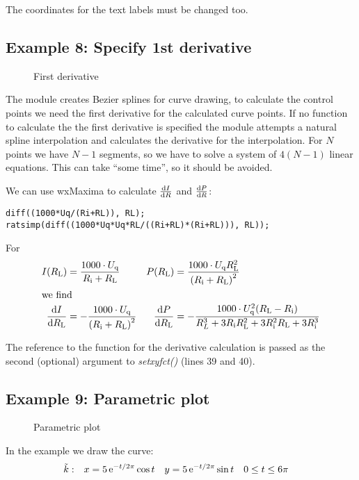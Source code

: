 \documentclass[origlongtable]{scrartcl}
\newcommand{\includepgfimage}[2]{%
\begin{figure}%
{\centering%
\caption{#2}\label{fig:#1}%
}%
\end{figure}%
}
\begin{document}
The coordinates for the text labels must be changed too.

\clearpage
\subsection[Derivative]{Example 8: Specify 1st derivative}
\includepgfimage{../examples/test008a}{First derivative}
The module creates Bezier splines for curve drawing, to calculate
the control points we need the first derivative for the calculated
curve points.
If no function to calculate the the first derivative is specified
the module attempts a natural spline interpolation and calculates
the derivative for the interpolation. For \(N\) points we have
\(N-1\) segments, so we have to solve a system of
\(4(N-1)\) linear equations. This can take ``some time'', so it should
be avoided.

We can use wxMaxima to calculate \(\frac{\mathrm{d} I}{\mathrm{d} R}\)
and \(\frac{\mathrm{d} P}{\mathrm{d} R}\):
\begin{lstlisting}
diff((1000*Uq/(Ri+RL)), RL);
ratsimp(diff((1000*Uq*Uq*RL/((Ri+RL)*(Ri+RL))), RL));
\end{lstlisting}
For
\begin{align*}
I(R_{\text{L}})&=\frac{1000\cdot{}U_{\text{q}}}{R_{\text{i}}+R_{\text{L}}}&P(R_{\text{L}})&=\frac{1000\cdot{}U_{\text{q}}R_{\text{L}}^2}{{(R_{\text{i}}+R_{\text{L}})}^2}\\
\intertext{we find}
\frac{\mathrm{d} I}{\mathrm{d} R_{\text{L}}}&=-\frac{1000\cdot{}U_{\text{q}}}{{(R_{\text{i}}+R_{\text{L}})}^2}&\frac{\mathrm{d} P}{\mathrm{d} R_{\text{L}}}&=-\frac{1000\cdot{} U_{\text{q}}^2(R_{\text{L}}-R_{\text{i}})}{R_{\text{}L}^3+3R_{\text{i}}R_{\text{L}}^2+3R_{\text{i}}^2R_{\text{L}}+3R_{\text{i}}^3}\end{align*}

The reference to the function for the derivative calculation is passed
as the second (optional) argument to
\textit{set\textunderscore{}xy\textunderscore{}fct()\/}
(lines 39 and 40).

\clearpage
\subsection[Parametric plot]{Example 9: Parametric plot}
\includepgfimage{../examples/test009a}{Parametric plot}
In the example we draw the curve:
\begin{align*}
\tilde{k}:&&x&=5\operatorname{e}^{-t/2\pi}\cos{t}&y&=5\operatorname{e}^{-t/2\pi}\sin{t}&0&\leq{}t\leq{}6\pi
\end{align*}
\end{document}
